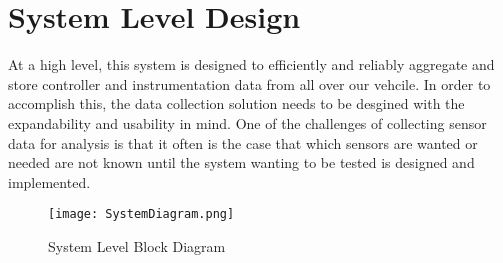 \section{System Level Design}

At a high level, this system is designed to efficiently and reliably aggregate and store controller and instrumentation data from all over our vehcile.
In order to accomplish this, the data collection solution needs to be desgined with the expandability and usability in mind.
One of the challenges of collecting sensor data for analysis is that it often is the case that which sensors are wanted or needed are not known until the system wanting to be tested is designed and implemented.

\begin{figure}[H]
	\centering
	\texttt{[image: SystemDiagram.png]}
	\caption{System Level Block Diagram}
	\label{fig:SysDiagram}
\end{figure}